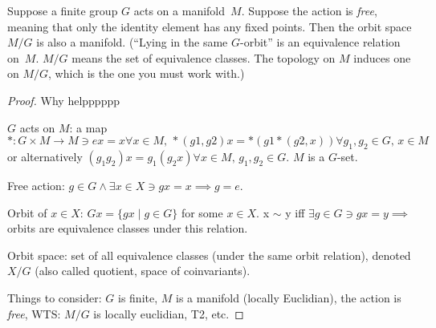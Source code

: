 \begin{problem}
        Suppose a finite group $G$ acts on a manifold~$M$.  Suppose
    the action is \textit{free}, meaning that only the identity
    element has any fixed points.  Then the orbit space $M/G$ is
    also a manifold.  (``Lying in the same $G$-orbit'' is an
    equivalence relation on~$M$.  $M/G$ means the set of equivalence
    classes.  The topology on $M$ induces one on $M/G$, which
    is the one you must work with.)
\end{problem}
\begin{proof}
    Why helpppppp

    $G$ acts on $M$: a map $*:G \times M \to M \ni ex=x \forall x \in M, \, *(g1,g2)x=*(g1*(g2,x)) \forall g_1,g_2 \in G, \, x \in M$ or alternatively $(g_1g_2)x=g_1(g_2x) \forall x \in M, \, g_1, g_2 \in G.$ $M$ is a $G$-set. 

    Free action: $g \in G \land \exists x \in X \ni gx=x \implies g=e.$

    Orbit of $x \in X$: $Gx = \{ gx \mid g \in G \}$ for some $x \in X$. x $\sim$ y iff $\exists g \in G \ni gx=y \implies$ orbits are equivalence classes under this relation. 

    Orbit space: set of all equivalence classes (under the same orbit relation), denoted $X/G$ (also called quotient, space of coinvariants).

    Things to consider: $G$ is finite, $M$ is a manifold (locally Euclidian), the action is  \textit{free}, WTS: $M/G$ is locally euclidian, T2, etc.
    \vspace{5mm}
    
\end{proof}


